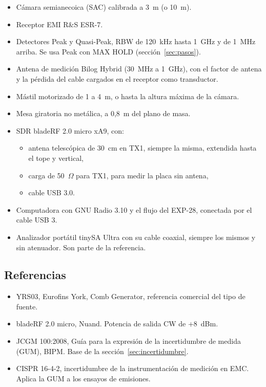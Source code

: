 \documentclass[11pt,a4paper]{article}
\begin{document}
\begin{itemize}
  \item Cámara semianecoica (SAC) calibrada a 3~m (o 10~m).
  \item Receptor EMI R\&S ESR-7.
  \item Detectores Peak y Quasi-Peak, RBW de 120~kHz hasta 1~GHz y de 1~MHz arriba. Se usa Peak con MAX HOLD (sección~\ref{sec:pasos}).
  \item Antena de medición Bilog Hybrid (30~MHz a 1~GHz), con el factor de antena y la pérdida del cable cargados en el receptor como transductor.
  \item Mástil motorizado de 1 a 4~m, o hasta la altura máxima de la cámara.
  \item Mesa giratoria no metálica, a 0,8~m del plano de masa.
  \item SDR bladeRF 2.0 micro xA9, con:
        \begin{itemize}
          \item antena telescópica de 30~cm en TX1, siempre la misma, extendida hasta el tope y vertical,
          \item carga de 50~$\Omega$ para TX1, para medir la placa sin antena,
          \item cable USB 3.0.
        \end{itemize}
  \item Computadora con GNU Radio 3.10 y el flujo del EXP-28, conectada por el cable USB 3.
  \item Analizador portátil tinySA Ultra con su cable coaxial, siempre los mismos y sin atenuador. Son parte de la referencia.
\end{itemize}

\subsection{Referencias}

\begin{itemize}
  \item YRS03, Eurofins York, Comb Generator, referencia comercial del tipo de fuente.
  \item bladeRF 2.0 micro, Nuand. Potencia de salida CW de +8~dBm.
  \item JCGM 100:2008, Guía para la expresión de la incertidumbre de medida (GUM), BIPM. Base de la sección~\ref{sec:incertidumbre}.
  \item CISPR 16-4-2, incertidumbre de la instrumentación de medición en EMC. Aplica la GUM a los ensayos de emisiones.
\end{itemize}
\end{document}
